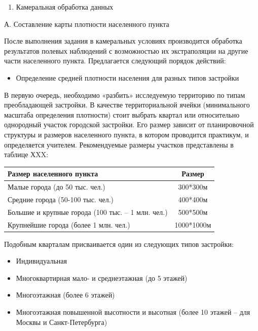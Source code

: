\documentclass[
  11pt,
  russian,
]{book}
\providecommand{\tightlist}{%
  \setlength{\itemsep}{0pt}\setlength{\parskip}{0pt}}
\begin{document}
\begin{enumerate}
\def\labelenumi{\arabic{enumi}.}
\setcounter{enumi}{2}
\tightlist
\item
  Камеральная обработка данных
\end{enumerate}

А. Составление карты плотности населенного пункта

После выполнения задания в камеральных условиях производится обработка результатов полевых наблюдений с возможностью их экстраполяции на другие части населенного пункта. Предлагается следующий порядок действий:

\begin{itemize}
\tightlist
\item
  Определение средней плотности населения для разных типов застройки
\end{itemize}

В первую очередь, необходимо «разбить» исследуемую территорию по типам преобладающей застройки. В качестве территориальной ячейки (минимального масштаба определения плотности) стоит выбрать квартал или относительно однородный участок городской застройки. Его размер зависит от планировочной структуры и размеров населенного пункта, в котором проводится практикум, и определяется учителем. Рекомендуемые размеры участков представлены в таблице ХXX:

\begin{longtable}[]{@{}lc@{}}
\toprule
Размер населенного пункта & Размер \\
\midrule
\endhead
Малые города (до 50 тыс. чел.) & 300*300м \\
Средние города (50-100 тыс. чел.) & 400*400м \\
Большие и крупные города (100 тыс. -- 1 млн. чел.) & 500*500м \\
Крупнейшие города (более 1 млн. чел.) & 1000*1000м \\
\bottomrule
\end{longtable}

Подобным кварталам присваивается один из следующих типов застройки:

\begin{itemize}
\item
  Индивидуальная
\item
  Многоквартирная мало- и среднеэтажная (до 5 этажей)
\item
  Многоэтажная (более 6 этажей)
\item
  Многоэтажная повышенной высотности и высотная (более 10 этажей -- для Москвы и Санкт-Петербурга)
\end{itemize}
\end{document}
